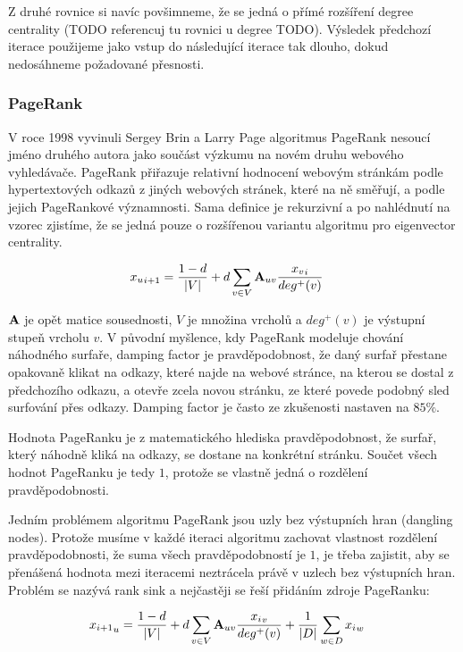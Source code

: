 \documentclass[12pt,titlepage]{report}
\begin{document}
Z druhé rovnice si navíc povšimneme, že se jedná o přímé rozšíření degree
centrality (TODO referencuj tu rovnici u degree TODO). Výsledek předchozí
iterace použijeme jako vstup do následující iterace tak dlouho, dokud
nedosáhneme požadované přesnosti.

\subsubsection{PageRank}
V roce 1998 vyvinuli Sergey Brin a Larry Page algoritmus PageRank nesoucí jméno
druhého autora jako součást výzkumu na novém druhu webového vyhledávače.
PageRank přiřazuje relativní hodnocení webovým stránkám podle hypertextových
odkazů z jiných webových stránek, které na ně směřují, a podle jejich
PageRankové významnosti. Sama definice je rekurzivní a po nahlédnutí na vzorec
zjistíme, že se jedná pouze o rozšířenou variantu algoritmu pro eigenvector
centrality.

\begin{align}
{x_u}_{i + 1} &= \frac{1 - d}{|V|} + d \displaystyle\sum_{v \in V} {\bf A}_{uv}
\frac{{x_v}_{i}}{deg^+ (v)}
\end{align}

${\bf A}$ je opět matice sousednosti, $V$ je množina vrcholů a $deg^+(v)$ je
výstupní stupeň vrcholu $v$.  V původní myšlence, kdy PageRank modeluje chování
náhodného surfaře, damping factor je pravděpodobnost, že daný surfař přestane
opakovaně klikat na odkazy, které najde na webové stránce, na kterou se dostal
z předchozího odkazu, a otevře zcela novou stránku, ze které povede podobný
sled surfování přes odkazy.  Damping factor je často ze zkušenosti nastaven na
$85\%$.

Hodnota PageRanku je z matematického hlediska pravděpodobnost, že surfař, který
náhodně kliká na odkazy, se dostane na konkrétní stránku. Součet všech hodnot
PageRanku je tedy $1$, protože se vlastně jedná o rozdělení pravděpodobnosti.

Jedním problémem algoritmu PageRank jsou uzly bez výstupních hran (dangling
nodes). Protože musíme v každé iteraci algoritmu zachovat vlastnost rozdělení
pravděpodobnosti, že suma všech pravděpodobností je $1$, je třeba zajistit, aby
se přenášená hodnota mezi iteracemi neztrácela právě v uzlech bez výstupních
hran. Problém se nazývá rank sink a nejčastěji se řeší přidáním zdroje
PageRanku:

\begin{align}
{x_{i + 1}}_u &= \frac{1 - d}{|V|} + d \displaystyle\sum_{v \in V} {\bf A}_{uv} \frac{{x_i}_v}{deg^+ (v)} + \frac{1}{|D|} \displaystyle\sum_{w \in D} {x_i}_w
\end{align}
\end{document}
